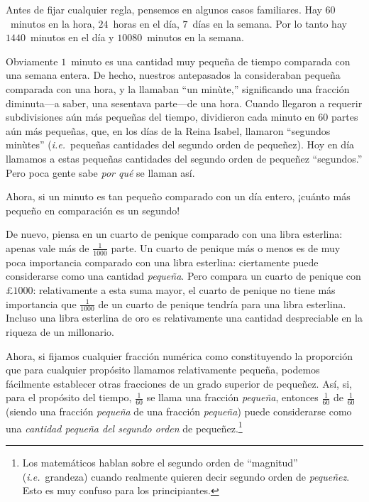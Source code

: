 \documentclass[12pt]{book}[2005/09/16]
\newcommand{\DPPageSep}[2]{\Pagelabel{#2}}
\newcommand{\Pagelabel}[1]
  {\phantomsection\label{#1}}
\newcommand{\IE}{\textit{i.e.}}
\newcommand{\DPnote}[1]{}%
\begin{document}
Antes de fijar cualquier regla, pensemos en algunos
casos familiares. Hay $60$~minutos en la hora,
$24$~horas en el día, $7$~días en la semana. Por lo tanto hay
$1440$~minutos en el día y $10080$~minutos
en la semana.

Obviamente $1$~minuto es una cantidad muy pequeña de
tiempo comparada con una semana entera. De hecho, nuestros
antepasados la consideraban pequeña comparada con una
hora, y la llamaban ``un minùte,'' significando una fracción
diminuta---a saber, una sesentava parte---de una hora. Cuando
llegaron a requerir subdivisiones aún más pequeñas del tiempo,
dividieron cada minuto en $60$ partes aún más pequeñas,
que, en los días de la Reina Isabel, llamaron ``segundos
minùtes''\DPnote{** TN: [sic]} (\IE~pequeñas cantidades del segundo orden de
pequeñez). Hoy en día llamamos a estas pequeñas cantidades
\DPPageSep{016.png}{4}%
del segundo orden de pequeñez ``segundos.'' Pero poca
gente sabe \emph{por qué} se llaman así.

Ahora, si un minuto es tan pequeño comparado con un
día entero, ¡cuánto más pequeño en comparación es un
segundo!

De nuevo, piensa en un cuarto de penique comparado con una
libra esterlina: apenas vale más de $\frac{1}{1000}$ parte.
Un cuarto de penique más o menos es de muy poca importancia
comparado con una libra esterlina: ciertamente puede considerarse
como una cantidad \emph{pequeña}. Pero compara un cuarto de penique
con £$1000$: relativamente a esta suma mayor, el
cuarto de penique no tiene más importancia que $\frac{1}{1000}$ de un
cuarto de penique tendría para una libra esterlina. Incluso una libra
esterlina de oro es relativamente una cantidad despreciable en la
riqueza de un millonario.

Ahora, si fijamos cualquier fracción numérica como
constituyendo la proporción que para cualquier propósito
llamamos relativamente pequeña, podemos fácilmente establecer otras
fracciones de un grado superior de pequeñez. Así, si,
para el propósito del tiempo, $\frac{1}{60}$ se llama una fracción \emph{pequeña},
entonces $\frac{1}{60}$ de $\frac{1}{60}$ (siendo una fracción \emph{pequeña} de una fracción
\emph{pequeña}) puede considerarse como una \emph{cantidad pequeña del
segundo orden}\Pagelabel{smallness} de pequeñez.\footnote
  {Los matemáticos hablan sobre el segundo orden de ``magnitud''
  (\IE~grandeza) cuando realmente quieren decir segundo orden de \emph{pequeñez}.
  Esto es muy confuso para los principiantes.}
\end{document}
